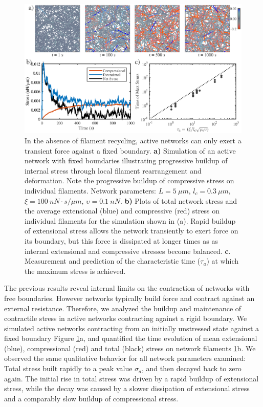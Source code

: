 \documentclass[10pt,letterpaper]{article}
\begin{document}
\begin{figure}[h!]
	\centering
	\includegraphics[width=\hsize]{figures/figure4b}
	\caption{\label{fig:active_str} In the absence of filament recycling, active networks can only exert a transient force against a fixed boundary.  \textbf{a)} Simulation of an active network with fixed boundaries illustrating progressive buildup of internal stress through local filament rearrangement and deformation. Note the progressive buildup of compressive stress on individual filaments. Network parameters: $L=5\: \mu m$, $l_c=0.3\: \mu m$, $\xi=100\: nN\cdot s/\mu m$, $\upsilon=0.1\: nN$.  \textbf{b)} Plots of total network stress and the average extensional (blue) and compressive (red) stress on individual filaments for the simulation shown in (a). Rapid buildup of extensional stress allows the network transiently to exert force on its boundary, but this force is dissipated at longer times as   as internal extensional and compressive stresses become balanced. \textbf{c}. Measurement and prediction of the characteristic time ($\tau_a$) at which the maximum stress is achieved. }
\end{figure}

The previous results reveal internal limits on the contraction of networks with free boundaries.  However networks typically build force and contract against an external resistance.  Therefore, we analyzed the buildup and maintenance of contractile stress in active networks contracting against a rigid boundary. We simulated active networks contracting from an initially unstressed state against a fixed boundary Figure \ref{fig:active_str}a, and  quantified the time evolution of mean extensional (blue), compressional (red) and total (black) stress on network filaments \ref{fig:active_str}b. We observed the same qualitative behavior for all network parameters examined: Total stress built rapidly to a peak value $\sigma_a$, and then decayed back to zero again.  The initial rise in total stress was driven by a  rapid buildup of extensional stress, while the decay was caused by a slower dissipation of extensional stress and a comparably slow buildup of compressional stress.  
\end{document}
